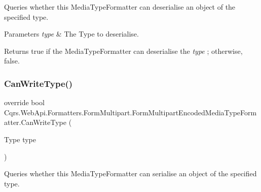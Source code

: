 Queries whether this Media\+Type\+Formatter can deserialise an object of the specified type. 


\begin{DoxyParams}{Parameters}
{\em type} & The Type to deserialise.\\
\hline
\end{DoxyParams}
\begin{DoxyReturn}{Returns}
true if the Media\+Type\+Formatter can deserialise the {\itshape type} ; otherwise, false.
\end{DoxyReturn}
\mbox{\label{classCqrs_1_1WebApi_1_1Formatters_1_1FormMultipart_1_1FormMultipartEncodedMediaTypeFormatter_a9fac23d803544c138f9e2fa75042a100_a9fac23d803544c138f9e2fa75042a100}} 
\subsubsection{\texorpdfstring{Can\+Write\+Type()}{CanWriteType()}}
{\footnotesize\ttfamily override bool Cqrs.\+Web\+Api.\+Formatters.\+Form\+Multipart.\+Form\+Multipart\+Encoded\+Media\+Type\+Formatter.\+Can\+Write\+Type (\begin{DoxyParamCaption}\item[{Type}]{type }\end{DoxyParamCaption})}



Queries whether this Media\+Type\+Formatter can serialise an object of the specified type. 


